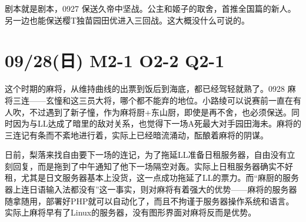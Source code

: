 
剧本就是剧本，0927 保送久帝中坚战。公主和姬子的取舍，首推全国篇的新人。另一边也能保送樱T独苗园田优进入三回战。这大概没什么可说的。

\section{09/28(日) M2-1 O2-2 Q2-1}


这个时期的麻将，从维持曲线的出票到饭后到海底，都已经驾轻就熟了。0928 麻将三连——玄憧和这三员大将，哪个都不能弃的地位。小路绫可以说赛前一直在有人吹，不过遇到了新子憧，作为麻将厨+东山厨，即使是再不舍，也必须保送。同时因为与LL达成了暗里的敌对关系，也觉得下一场A死最大对手园田海未。麻将的三连记有条而不紊地进行着，实际上已经暗流涌动，酝酿着麻将的阴谋。

日前，梨落来找自由要下一场的连记，为了拖延LL准备日租服务器，自由没有立刻回复，而是拖到了中午通知了他下一场隔空对轰。实际上日租服务器确实不好租，尤其是日文服务器基本上没货，这一点成功拖延了LL的票力。而“麻厨的服务器上连日语输入法都没有”这一事实，则对麻将有着强大的优势——麻将的服务器随拿随用，部署好PHP就可以自动化了，而且不拘谨于服务器操作系统和语言。实际上麻将早有了Linux的服务器，没有图形界面对麻将反而是优势。

